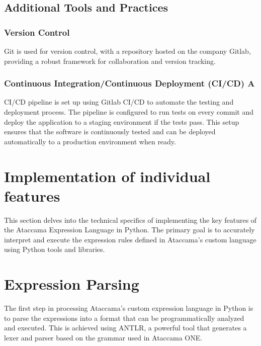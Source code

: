 \subsection{Additional Tools and Practices}

\subsubsection{Version Control}

Git is used for version control, with a repository hosted on the company Gitlab, providing a robust framework for collaboration and version tracking.

\subsubsection{Continuous Integration/Continuous Deployment (CI/CD) A}

CI/CD pipeline is set up using Gitlab CI/CD to automate the testing and deployment process. The pipeline is configured to run tests on every commit and deploy the application to a staging environment if the tests pass. This setup ensures that the software is continuously tested and can be deployed automatically to a production environment when ready.


\section{Implementation of individual features}

This section delves into the technical specifics of implementing the key features of the Ataccama Expression Language in Python. The primary goal is to accurately interpret and execute the expression rules defined in Ataccama's custom language using Python tools and libraries.

\section{Expression Parsing}

The first step in processing Ataccama’s custom expression language in Python is to parse the expressions into a format that can be programmatically analyzed and executed. This is achieved using ANTLR, a powerful tool that generates a lexer and parser based on the grammar used in Ataccama ONE.

